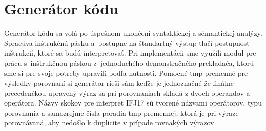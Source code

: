 \documentclass[14pt, a4paper]{extarticle}
\begin{document}
\bigskip

\begin{table}[h]
\centering
{}
\caption{Tabuľka pre precedenčnú analýzu}
\label{psa}
\end{table}


\section{Generátor kódu }
Generátor kódu sa volá po úspešnom ukončení syntaktickej a sémantickej analýzy. Spracúva inštrukčnú pásku a~postupne na štandartný výstup tlačí postupnosť inštrukcií, ktoré sa budú interpretovať. Pri implementácii sme využili modul pre prácu s~inštrukčnou páskou z~jednoduchého demonstračného prekladača, ktorú sme si pre svoje potreby upravili podľa nutnosti.
Pomocné tmp premenné pre výsledky porovnaní si generátor rieši sám keďže je jednoznačné že finálne precedenčkou upravený výraz sa pri porovnaniach skladá z dvoch operandov a operátora. Názvy skokov pre interpret IFJ17 sú tvorené názvami operátorov, typu porovnania a samozrejme čísla poradia tmp premennej, ktorá je pri výraze porovnávaná, aby nedošlo k duplicite v prípade rovnakých výrazov.
\end{document}
